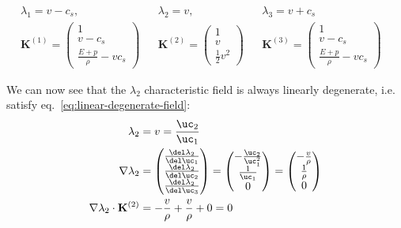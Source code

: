 \begin{align}
    &\lambda_1 = v - c_s, &&
    \lambda_2 = v,  &&
    \lambda_3 = v + c_s && \\
    &\mathbf{K}^{(1)} = \begin{pmatrix}
                         1 \\ v - c_s \\ \frac{E + p}{\rho} - v c_s
                        \end{pmatrix} &&
    \mathbf{K}^{(2)} = \begin{pmatrix}
                         1 \\ v \\ \frac{1}{2} v^2
                        \end{pmatrix} &&
    \mathbf{K}^{(3)} = \begin{pmatrix}
                         1 \\ v - c_s \\ \frac{E + p}{\rho} - v c_s
                        \end{pmatrix} &&
\end{align}

We can now see that the $\lambda_2$ characteristic field is always linearly degenerate, i.e.
satisfy eq.~\ref{eq:linear-degenerate-field}:
\begin{align}
  \lambda_2 &= v = \frac{\uc_2}{\uc_1} \\
  \nabla \lambda_2 &= \begin{pmatrix}
                       \frac{\del \lambda_2}{\del \uc_1} \\
                       \frac{\del \lambda_2}{\del \uc_2} \\
                       \frac{\del \lambda_2}{\del \uc_3}
                      \end{pmatrix}
                   =  \begin{pmatrix}
                        -\frac{\uc_2}{\uc_1^2} \\
                        \frac{1}{\uc_1} \\
                        0
                      \end{pmatrix}
                   =  \begin{pmatrix}
                        -\frac{v}{\rho} \\
                        \frac{1}{\rho} \\
                        0
                      \end{pmatrix}
                      \\
 \nabla \lambda_2 \cdot \mathbf{K}^{(2)} &= -\frac{v}{\rho} + \frac{v}{\rho} + 0 = 0
\end{align}

